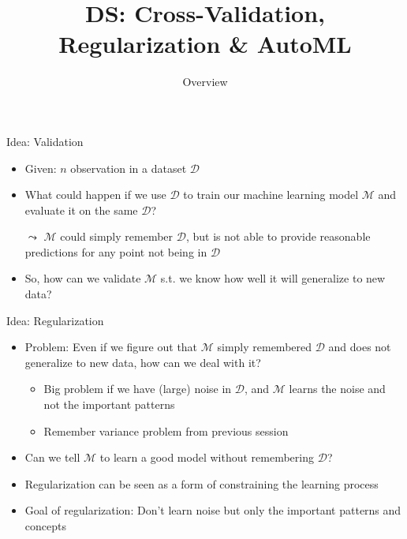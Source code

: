 \documentclass[aspectratio=169]{../latex_main/tntbeamer}  %
\title[CV, Reg \& AutoML]{DS: Cross-Validation, Regularization \& AutoML}
\subtitle{Overview}
\begin{document}
	
	\maketitle
	\begin{frame}[c]{Idea: Validation}
	    
	    \begin{itemize}
	        \item Given: $n$ observation in a dataset $\mathcal{D}$
	        \item What could happen if we use $\mathcal{D}$ to train our machine learning model $\mathcal{M}$ and evaluate it on the same $\mathcal{D}$?
	        \pause
	        \item[$\leadsto$] $\mathcal{M}$ could simply remember $\mathcal{D}$, but is not able to provide reasonable predictions for any point not being in $\mathcal{D}$
	        \bigskip
	        \pause
	        \item So, how can we validate $\mathcal{M}$ s.t. we know how well it will generalize to new data?
	    
	    \end{itemize}
	    
	    
	\end{frame}
	
	\begin{frame}[c]{Idea: Regularization}
	    
	    \begin{itemize}
	        \item Problem: Even if we figure out that $\mathcal{M}$ simply remembered $\mathcal{D}$ and does not generalize to new data, how can we deal with it?
	        \begin{itemize}
	            \item Big problem if we have (large) noise in $\mathcal{D}$, and $\mathcal{M}$ learns the noise and not the important patterns
	            \item Remember \alert{variance} problem from previous session
	        \end{itemize}
	        \pause
	        \bigskip
	        \item Can we tell $\mathcal{M}$ to learn a good model without remembering $\mathcal{D}$?
	        \item Regularization can be seen as a form of constraining the learning process
	        \item Goal of regularization: Don't learn noise but only the important patterns and concepts
	    \end{itemize}
	\end{frame}
	
\end{document}

